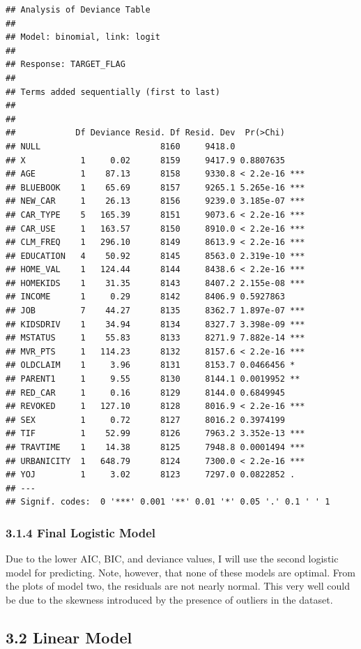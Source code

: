 \documentclass[]{article}
\begin{document}
\begin{verbatim}
## Analysis of Deviance Table
## 
## Model: binomial, link: logit
## 
## Response: TARGET_FLAG
## 
## Terms added sequentially (first to last)
## 
## 
##            Df Deviance Resid. Df Resid. Dev  Pr(>Chi)    
## NULL                        8160     9418.0              
## X           1     0.02      8159     9417.9 0.8807635    
## AGE         1    87.13      8158     9330.8 < 2.2e-16 ***
## BLUEBOOK    1    65.69      8157     9265.1 5.265e-16 ***
## NEW_CAR     1    26.13      8156     9239.0 3.185e-07 ***
## CAR_TYPE    5   165.39      8151     9073.6 < 2.2e-16 ***
## CAR_USE     1   163.57      8150     8910.0 < 2.2e-16 ***
## CLM_FREQ    1   296.10      8149     8613.9 < 2.2e-16 ***
## EDUCATION   4    50.92      8145     8563.0 2.319e-10 ***
## HOME_VAL    1   124.44      8144     8438.6 < 2.2e-16 ***
## HOMEKIDS    1    31.35      8143     8407.2 2.155e-08 ***
## INCOME      1     0.29      8142     8406.9 0.5927863    
## JOB         7    44.27      8135     8362.7 1.897e-07 ***
## KIDSDRIV    1    34.94      8134     8327.7 3.398e-09 ***
## MSTATUS     1    55.83      8133     8271.9 7.882e-14 ***
## MVR_PTS     1   114.23      8132     8157.6 < 2.2e-16 ***
## OLDCLAIM    1     3.96      8131     8153.7 0.0466456 *  
## PARENT1     1     9.55      8130     8144.1 0.0019952 ** 
## RED_CAR     1     0.16      8129     8144.0 0.6849945    
## REVOKED     1   127.10      8128     8016.9 < 2.2e-16 ***
## SEX         1     0.72      8127     8016.2 0.3974199    
## TIF         1    52.99      8126     7963.2 3.352e-13 ***
## TRAVTIME    1    14.38      8125     7948.8 0.0001494 ***
## URBANICITY  1   648.79      8124     7300.0 < 2.2e-16 ***
## YOJ         1     3.02      8123     7297.0 0.0822852 .  
## ---
## Signif. codes:  0 '***' 0.001 '**' 0.01 '*' 0.05 '.' 0.1 ' ' 1
\end{verbatim}

\subsubsection{3.1.4 Final Logistic Model}\label{final-logistic-model}

Due to the lower AIC, BIC, and deviance values, I will use the second
logistic model for predicting. Note, however, that none of these models
are optimal. From the plots of model two, the residuals are not nearly
normal. This very well could be due to the skewness introduced by the
presence of outliers in the dataset.

\subsection{3.2 Linear Model}\label{linear-model}
\end{document}
